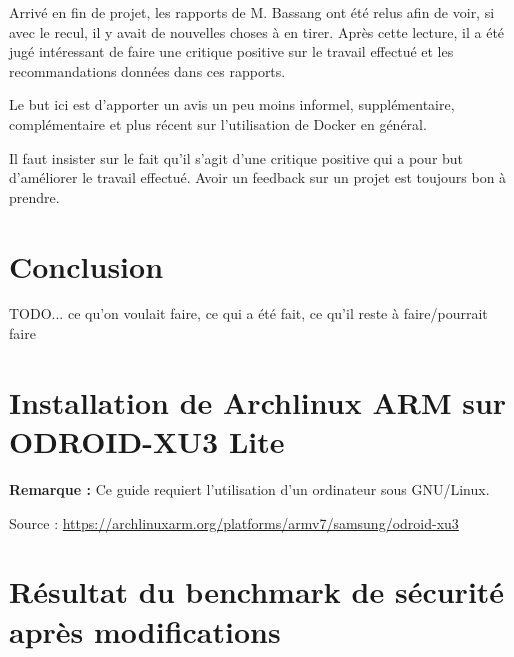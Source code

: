 \documentclass[11pt,a4paper,oneside]{report}
\newcommand{\odroid}{ODROID-XU3 Lite }
\begin{document}
Arrivé en fin de projet, les rapports de M. Bassang ont été relus afin de voir, si avec le recul, il y avait de nouvelles choses à en tirer. Après cette lecture, il a été jugé intéressant de faire une critique positive sur le travail effectué et les recommandations données dans ces rapports. 

Le but ici est d'apporter un avis un peu moins informel, supplémentaire, complémentaire et plus récent sur l'utilisation de Docker en général.

Il faut insister sur le fait qu'il s'agit d'une critique positive qui a pour but d'améliorer le travail effectué. Avoir un feedback sur un projet est toujours bon à prendre.




\chapter{Conclusion}
TODO... ce qu'on voulait faire, ce qui a été fait, ce qu'il reste à faire/pourrait faire


\nocite{*} %



\begin{appendices}

\chapter{Installation de Archlinux ARM sur \odroid}\label{install_alarm_odroid}
\textbf{Remarque : }Ce guide requiert l'utilisation d'un ordinateur sous GNU/Linux.

Source : \url{https://archlinuxarm.org/platforms/armv7/samsung/odroid-xu3}




\chapter{Résultat du benchmark de sécurité après modifications}\label{apx-bench-after-modif}

\inputminted[xleftmargin=20pt, linenos=true, breaklines=true, frame=single, framesep=6pt, tabsize=2, fontfamily=courier, fontsize=\small]{text}{../../docker_security_benchmark/after-modifications.log}

\end{appendices}
\end{document}
